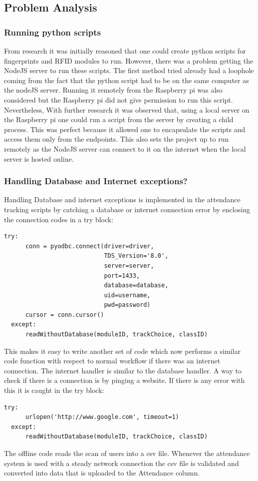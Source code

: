 \subsection*{Problem Analysis}
\subsubsection*{Running python scripts}
From research it was initially reasoned that one could create python scripts for fingerprints and RFID modules to run. However, there was a problem getting the NodeJS server to run these scripts. The first method tried already had a loophole coming from the fact that the python script had to be on the same computer as the nodeJS server. Running it remotely from the Raspberry pi was also considered but the Raspberry pi did not give permission to run this script. Nevertheless, With further research it was observed that, using a local server on the Raspberry pi one could run a script from the server by creating a child process. This was perfect because it allowed one to encapsulate the scripts and access them only from the endpoints. This also sets the project up to run remotely as the NodeJS server can connect to it on the internet when the local server is hosted online.
 
\subsubsection*{Handling Database and Internet exceptions?}
Handling Database and internet exceptions is implemented in the attendance tracking scripts by catching a database or internet connection error by enclosing the connection codes in a try block:
\begin{verbatim}
try:
      conn = pyodbc.connect(driver=driver,
                            TDS_Version='8.0',
                            server=server,
                            port=1433,
                            database=database,
                            uid=username,
                            pwd=password)
      cursor = conn.cursor()
  except:
      readWithoutDatabase(moduleID, trackChoice, classID)
\end{verbatim}
This makes it easy to write another set of code which now performs a similar code function with respect to normal workflow if there was an internet connection. The internet handler is similar to the database handler. A way to check if there is a connection is by pinging a website. If there is any error with this it is caught in the try block\label{internet handler}:
\begin{verbatim}
try:
      urlopen('http://www.google.com', timeout=1)
  except:
      readWithoutDatabase(moduleID, trackChoice, classID)
\end{verbatim}
The offline code reads the scan of users into a csv file. Whenever the attendance system is used with a steady network connection the csv file is validated and converted into data that is uploaded to the Attendance column.
